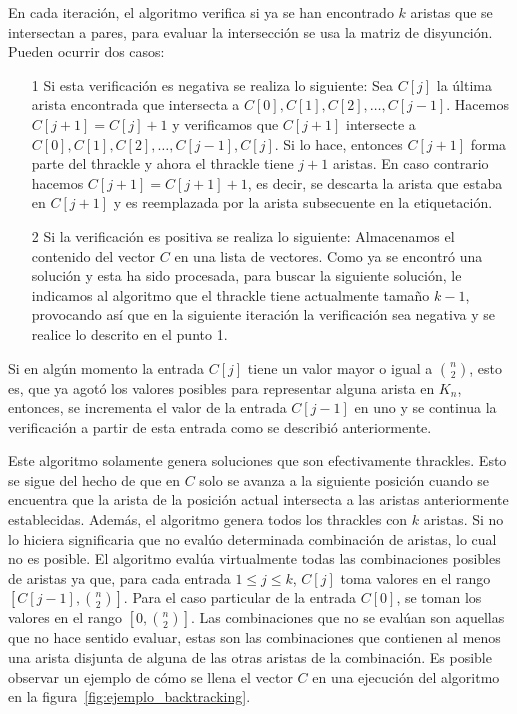   En cada iteración, el algoritmo verifica si ya se han encontrado $k$ aristas
  que se intersectan a pares, para evaluar la intersección se usa la matriz de
  disyunción. Pueden ocurrir dos casos:
  \begin{itemize}
    \item[1] Si esta verificación es negativa se realiza lo siguiente:
    Sea $C[j]$ la última arista encontrada que intersecta a $C[0],C[1],C[2],\dots,C[j-1]$. Hacemos $C[j+1]=C[j]+1$ y verificamos que $C[j+1]$ intersecte a $C[0],C[1],C[2],\dots,C[j-1],C[j]$.
    Si lo hace, entonces $C[j+1]$ forma parte del thrackle y ahora el thrackle tiene $j+1$ aristas. En caso contrario hacemos $C[j+1]=C[j+1]+1$, es decir, se descarta la arista que estaba en $C[j+1]$ y es reemplazada por la arista subsecuente en la etiquetación.
    \item[2] Si la verificación es positiva se realiza lo siguiente:
    Almacenamos el contenido del vector $C$ en una lista de vectores.
    Como ya se encontró una solución y esta ha sido procesada, para buscar la siguiente solución, le indicamos al algoritmo que el thrackle tiene actualmente tamaño $k-1$, provocando así que en la siguiente iteración la verificación sea negativa y se realice lo descrito en el punto 1.
  \end{itemize}
  Si en algún momento la entrada $C[j]$ tiene un valor mayor o igual a
  $\binom{n}{2}$, esto es, que ya agotó los valores posibles para representar
  alguna arista en $K_n$, entonces, se incrementa el valor de la entrada $C[j-1]$ en uno y se continua la verificación a partir de esta entrada como se describió anteriormente.

  Este algoritmo solamente genera soluciones que son efectivamente thrackles.
  Esto se sigue del hecho de que en $C$ solo se avanza a la siguiente posición
  cuando se encuentra que la arista de la posición actual intersecta a las
  aristas anteriormente establecidas. Además, el algoritmo genera todos los
  thrackles con $k$ aristas. Si no lo hiciera significaria que no evalúo
  determinada combinación de aristas, lo cual no es posible. El algoritmo
  evalúa virtualmente todas las combinaciones posibles de aristas ya que, para
  cada entrada $1\leq j\leq k$, $C[j]$ toma valores en el rango
  $\left[C[j-1],\binom{n}{2}\right]$. Para el caso particular de la entrada
  $C[0]$, se toman los valores en el rango $\left[ 0, \binom{n}{2}\right]$. Las
  combinaciones que no se evalúan son aquellas que no hace sentido evaluar,
  estas son las combinaciones que contienen al menos una arista disjunta de
  alguna de las otras aristas de la combinación. Es posible observar un ejemplo de cómo se llena el vector $C$ en una ejecución del algoritmo en la figura~\ref{fig:ejemplo_backtracking}.


